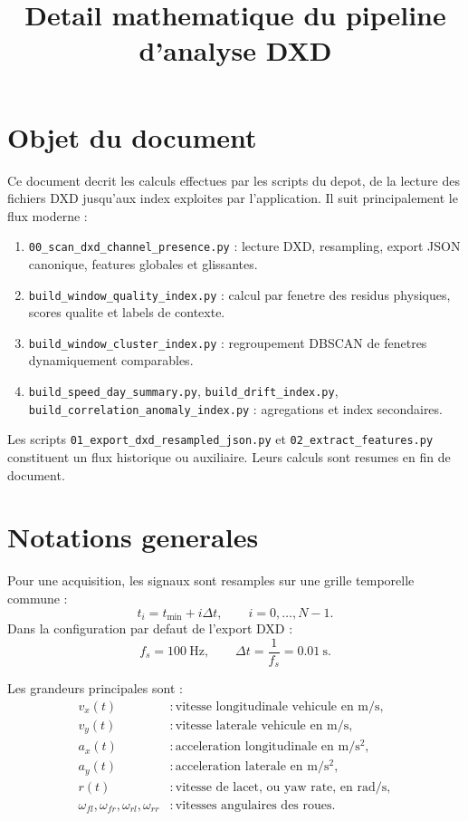 \documentclass[11pt,a4paper]{article}
\title{Detail mathematique du pipeline d'analyse DXD}
\author{}
\date{}
\begin{document}
\maketitle

\section{Objet du document}

Ce document decrit les calculs effectues par les scripts du depot, de la lecture des fichiers DXD jusqu'aux index exploites par l'application.
Il suit principalement le flux moderne :

\begin{enumerate}[label=\arabic*.]
  \item \texttt{00\_scan\_dxd\_channel\_presence.py} : lecture DXD, resampling, export JSON canonique, features globales et glissantes.
  \item \texttt{build\_window\_quality\_index.py} : calcul par fenetre des residus physiques, scores qualite et labels de contexte.
  \item \texttt{build\_window\_cluster\_index.py} : regroupement DBSCAN de fenetres dynamiquement comparables.
  \item \texttt{build\_speed\_day\_summary.py}, \texttt{build\_drift\_index.py}, \texttt{build\_correlation\_anomaly\_index.py} : agregations et index secondaires.
\end{enumerate}

Les scripts \texttt{01\_export\_dxd\_resampled\_json.py} et \texttt{02\_extract\_features.py} constituent un flux historique ou auxiliaire. Leurs calculs sont resumes en fin de document.

\section{Notations generales}

Pour une acquisition, les signaux sont resamples sur une grille temporelle commune :
\[
  t_i = t_{\min} + i \Delta t,\qquad i=0,\ldots,N-1.
\]
Dans la configuration par defaut de l'export DXD :
\[
  f_s = 100~\mathrm{Hz}, \qquad \Delta t = \frac{1}{f_s}=0.01~\mathrm{s}.
\]

Les grandeurs principales sont :
\[
\begin{aligned}
  v_x(t) &: \text{vitesse longitudinale vehicule en m/s},\\
  v_y(t) &: \text{vitesse laterale vehicule en m/s},\\
  a_x(t) &: \text{acceleration longitudinale en } \mathrm{m/s^2},\\
  a_y(t) &: \text{acceleration laterale en } \mathrm{m/s^2},\\
  r(t) &: \text{vitesse de lacet, ou yaw rate, en rad/s},\\
  \omega_{fl},\omega_{fr},\omega_{rl},\omega_{rr} &: \text{vitesses angulaires des roues}.
\end{aligned}
\]
\end{document}
